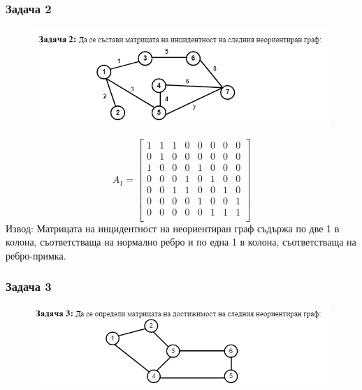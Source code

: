 \documentclass[fleqn, 12pt]{article}
\theoremstyle{definition}
\begin{document}
\subsubsection*{Задача 2}
\begin{figure} [htp!]
\includegraphics[width = \linewidth]{Pics/Discrete math/ex8/ex8-task2.png}
\end{figure}
$$A_I = 
\begin{bmatrix}
1 & 1 & 1 & 0 & 0 & 0 & 0 & 0 \\
0 & 1 & 0 & 0 & 0 & 0 & 0 & 0 \\
1 & 0 & 0 & 0 & 1 & 0 & 0 & 0 \\
0 & 0 & 0 & 1 & 0 & 1 & 0 & 0 \\
0 & 0 & 1 & 1 & 0 & 0 & 1 & 0 \\
0 & 0 & 0 & 0 & 1 & 0 & 0 & 1 \\
0 & 0 & 0 & 0 & 0 & 1 & 1 & 1 \\
\end{bmatrix}
$$
Извод: Матрицата на инцидентност на неориентиран граф съдържа по две 1 в колона, съответстваща на нормално ребро и по една 1 в колона, съответстваща на ребро-примка.
\subsubsection*{Задача 3}
\begin{figure} [htp!]
\includegraphics[width = \linewidth]{Pics/Discrete math/ex8/ex8-task3.png}
\end{figure}
\end{document}
